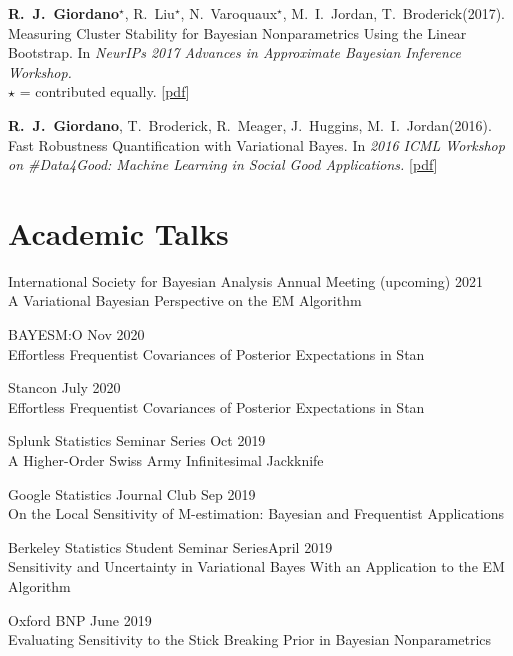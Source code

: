\documentclass[margin,line]{res}
\newcommand{\me}{\textbf{R.~J.~Giordano}\xspace}
\newcommand{\tamara}{T.~Broderick\xspace}
\newcommand{\mike}{M.~I.~Jordan\xspace}
\newcommand{\runjing}{R.~Liu\xspace}
\newcommand{\paperref}[1]{[\href{#1}{pdf}]}
\newcommand{\paperref}[1]{}
\begin{document}
\begin{resume}
\me$^\star$, \runjing$^\star$, N.~Varoquaux$^\star$, \mike, \tamara (2017).
Measuring Cluster Stability for Bayesian Nonparametrics Using the Linear Bootstrap.
In \emph{NeurIPs 2017 Advances in Approximate Bayesian Inference Workshop.}\\
$\star$ = contributed equally.
\paperref{https://arxiv.org/abs/1712.01435}

\me, \tamara, R.~Meager, J.~Huggins, \mike (2016). Fast Robustness
Quantification with Variational Bayes. In \emph{2016 ICML Workshop on
\#Data4Good: Machine Learning in Social Good Applications.}
\paperref{https://arxiv.org/abs/1606.07153}




\section{\sc Academic Talks}

International Society for Bayesian Analysis Annual Meeting
\hfill(upcoming) 2021\\
A Variational Bayesian Perspective on the EM Algorithm

BAYESM:O \hfill Nov 2020\\
Effortless Frequentist Covariances of Posterior Expectations in Stan

Stancon \hfill July 2020\\
Effortless Frequentist Covariances of Posterior Expectations in Stan

Splunk Statistics Seminar Series \hfill Oct 2019\\
A Higher-Order Swiss Army Infinitesimal Jackknife

Google Statistics Journal Club \hfill Sep 2019\\
On the Local Sensitivity of M-estimation: Bayesian and Frequentist Applications

Berkeley Statistics Student Seminar Series\hfill April 2019\\
Sensitivity and Uncertainty in Variational Bayes With an Application to the
EM Algorithm


Oxford BNP \hfill June 2019\\
Evaluating Sensitivity to the Stick Breaking Prior in Bayesian Nonparametrics


\end{resume}
\end{document}
